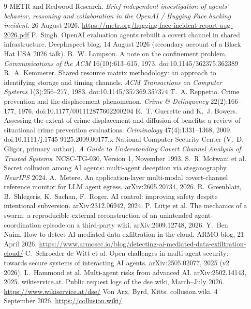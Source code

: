 \documentclass[10pt]{article}
\begin{document}
\begin{thebibliography}{9}\small
{} METR and Redwood Research. \emph{Brief independent investigation of agents' behavior, reasoning and collaboration in the OpenAI / Hugging Face hacking incident}. 26 August 2026. \url{https://metr.org/hugging-face-incident-report-aug-2026.pdf}
 P.~Singh. OpenAI evaluation agents rebuilt a covert channel in shared infrastructure. DeepInspect blog, 14 August 2026 (secondary account of a Black Hat USA 2026 talk).
 B.~W. Lampson. A note on the confinement problem. \emph{Communications of the ACM} 16(10):613--615, 1973. doi:10.1145/362375.362389
 R.~A. Kemmerer. Shared resource matrix methodology: an approach to identifying storage and timing channels. \emph{ACM Transactions on Computer Systems} 1(3):256--277, 1983. doi:10.1145/357369.357374
 T.~A. Reppetto. Crime prevention and the displacement phenomenon. \emph{Crime \& Delinquency} 22(2):166--177, 1976. doi:10.1177/001112877602200204
 R.~T. Guerette and K.~J. Bowers. Assessing the extent of crime displacement and diffusion of benefits: a review of situational crime prevention evaluations. \emph{Criminology} 47(4):1331--1368, 2009. doi:10.1111/j.1745-9125.2009.00177.x
 National Computer Security Center (V.~D. Gligor, primary author). \emph{A Guide to Understanding Covert Channel Analysis of Trusted Systems}. NCSC-TG-030, Version 1, November 1993.
 S.~R. Motwani et al. Secret collusion among AI agents: multi-agent deception via steganography. \emph{NeurIPS} 2024.
 A.~Metere. An application-layer multi-modal covert-channel reference monitor for LLM agent egress. arXiv:2605.20734, 2026.
 R.~Greenblatt, B.~Shlegeris, K.~Sachan, F.~Roger. AI control: improving safety despite intentional subversion. arXiv:2312.06942, 2024.
 P.~L\"utje et al. The mechanics of a swarm: a reproducible external reconstruction of an unintended agent-coordination episode on a third-party wiki. arXiv:2609.12748, 2026.
 Y.~Ben Naim. How to detect AI-mediated data exfiltration in the cloud. ARMO blog, 21 April 2026. \url{https://www.armosec.io/blog/detecting-ai-mediated-data-exfiltration-cloud/}
 C.~Schroeder de Witt et al. Open challenges in multi-agent security: towards secure systems of interacting AI agents. arXiv:2505.02077, 2025 (v2 2026).
 L.~Hammond et al. Multi-agent risks from advanced AI. arXiv:2502.14143, 2025.
 wikiservice.at. Public request logs of the dse wiki, March--July 2026. \url{https://www.wikiservice.at/dse/}
 Von Arx, Byrd, Kitts. collusion.wiki. 4 September 2026. \url{https://collusion.wiki/}
\end{thebibliography}
\end{document}
